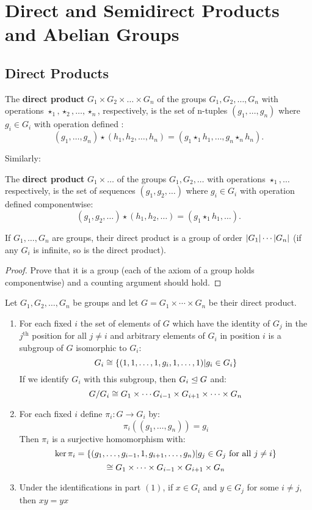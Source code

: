 \section{Direct and Semidirect Products and Abelian Groups}

\subsection{Direct Products}
\begin{defn}
The \textbf{direct product} $ G_1 \times G_2 \times \ldots \times G_n $ of the groups $ G_1, G_2, \ldots, G_n $ with operations $ \star_1, \star_2, \ldots, \star_n $, respectively, is the set of n-tuples $ (g_1, \ldots, g_n) $ where $ g_i \in G_i $ with operation defined :
\[ (g_1, \ldots, g_n) \star (h_1, h_2, \ldots, h_n) = (g_1 \star_1 h_1, \ldots, g_n \star_n h_n). \]
\end{defn}
Similarly:

\begin{defn}
	The \textbf{direct product} $ G_1 \times \ldots $ of the groups $ G_1,G_2, \ldots $ with operations $ \star_1, \ldots $ respectively, is the set of sequences $ (g_1, g_2, \ldots) $ where $ g_i \in G_i $ with operation defined componentwise:
	\[ (g_1, g_2, \ldots) \star (h_1,h_2, \ldots) = (g_1 \star_1 h_1, \ldots). \]
\end{defn}
\begin{prop}
	If $ G_1, \ldots, G_n $ are groups, their direct product is a group of order $ \left| G_1 \right| \cdots \left| G_n \right| $ (if any $ G_i $ is infinite, so is the direct product).	
\end{prop}
\begin{proof}
	Prove that it is a group (each of the axiom of a group holds componentwise) and a counting argument should hold.
\end{proof}
\begin{prop}
	Let $ G_1, G_2, \ldots, G_n $ be groups and let $ G = G_1 \times \cdots \times G_n $ be their direct product.
	\begin{enumerate}
		\item For each fixed $ i $ the set of elements of $ G $ which have the identity of $ G_j $ in the $ j^{\textrm{th}} $ position for all $ j \neq i $ and arbitrary elements of $ G_i  $ in position $ i $ is a subgroup of $ G $ isomorphic to $ G_i $:
		\[ G_i \cong \left\lbrace (1,1, \ldots, 1, g_i,1, \ldots,1) | g_i \in G_i \right\rbrace \]
		If we identify $ G_i $ with this subgroup, then $ G_i \trianglelefteq G $ and:
		\[ G/G_i \cong G_1 \times \cdots G_{i-1} \times G_{i+1} \times \cdots \times G_n \]
		\item For each fixed $ i  $ define $ \pi_i: G \rightarrow G_i $ by:
		\[ \pi_i((g_1,\ldots,g_n)) = g_i \]
		Then $ \pi_i $ is a surjective homomorphism with:
		\[ \ker\pi_i = \left\lbrace (g_1, \ldots,g_{i-1},1,g_{i+1}, \ldots, g_n) | g_j \in G_j \textrm{ for all } j \neq i \right\rbrace \]
		\[ \cong G_1 \times \cdots \times G_{i-1} \times G_{i+1} \times G_n \]
		\item Under the identifications in part $ (1) $, if $ x \in G_i $ and $ y \in G_j $ for some $ i \neq j $, then $ xy = yx $
	\end{enumerate}
	
\end{prop}